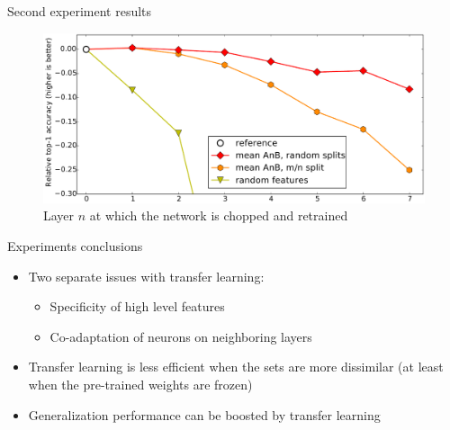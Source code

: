 \documentclass[xcolor=pdftex,dvipsnames,table,mathserif]{beamer}
\begin{document}
\begin{frame}{Second experiment results}

  \begin{figure}[ht]
    \centering
    \includegraphics[width=\textwidth]{transfer_learning_res_3}
    \scriptsize{Layer $n$ at which the network is chopped and retrained}
  \end{figure}

\end{frame}



\begin{frame}{Experiments conclusions}

\begin{itemize}
\item Two separate issues with transfer learning:
  \begin{itemize}
  \item Specificity of high level features
  \item Co-adaptation of neurons on neighboring layers
  \end{itemize}
\item Transfer learning is less efficient when the sets are more dissimilar (at least when the pre-trained weights are frozen)
\item Generalization performance can be boosted by transfer learning
\end{itemize}

\end{frame}



\end{document}

